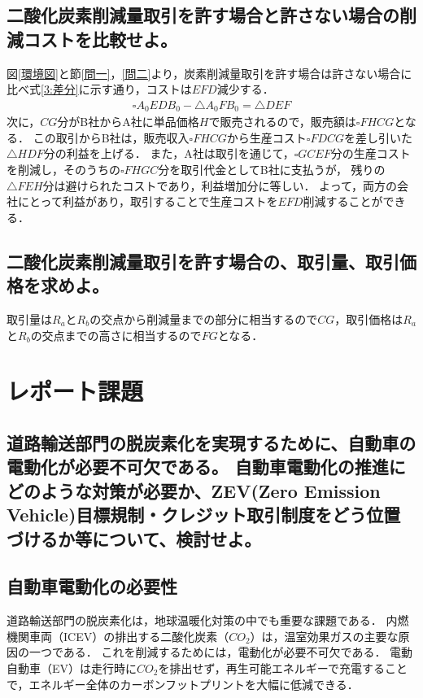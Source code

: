 \documentclass[titlepage,a4paper]{jsarticle}
\begin{document}
\subsection{二酸化炭素削減量取引を許す場合と許さない場合の削減コストを比較せよ。}
図\ref{環境図}と節\ref{問一}，\ref{問二}より，炭素削減量取引を許す場合は許さない場合に比べ式\eqref{3:差分}に示す通り，コストは$EFD$減少する．
\begin{align}
  \square A_0EDB_0 - \triangle A_0FB_0 = \triangle DEF\label{3:差分}
\end{align}
次に，$CG$分がB社からA社に単品価格$H$で販売されるので，販売額は$\square FHCG$となる．
この取引からB社は，販売収入$\square FHCG$から生産コスト$\square FDCG$を差し引いた$\triangle HDF$分の利益を上げる．
また，A社は取引を通じて，$\square GCEF$分の生産コストを削減し，そのうちの$\square FHGC$分を取引代金としてB社に支払うが，
残りの$\triangle FEH$分は避けられたコストであり，利益増加分に等しい．
よって，両方の会社にとって利益があり，取引することで生産コストを$EFD$削減することができる．

\subsection{二酸化炭素削減量取引を許す場合の、取引量、取引価格を求めよ。}
取引量は$R_a$と$R_b$の交点から削減量までの部分に相当するので$CG$，取引価格は$R_a$と$R_b$の交点までの高さに相当するので$FG$となる．

\section{レポート課題}
\renewcommand{\thesubsection}{\arabic{subsection}}
\subsection*{道路輸送部門の脱炭素化を実現するために、自動車の電動化が必要不可欠である。
  自動車電動化の推進にどのような対策が必要か、ZEV(Zero Emission Vehicle)目標規制・クレジット取引制度をどう位置づけるか等について、検討せよ。}
\subsection{自動車電動化の必要性}
道路輸送部門の脱炭素化は，地球温暖化対策の中でも重要な課題である．
内燃機関車両（ICEV）の排出する二酸化炭素（$CO_2$）は，温室効果ガスの主要な原因の一つである．
これを削減するためには，電動化が必要不可欠である．
電動自動車（EV）は走行時に$CO_2$を排出せず，再生可能エネルギーで充電することで，エネルギー全体のカーボンフットプリントを大幅に低減できる．
\end{document}
